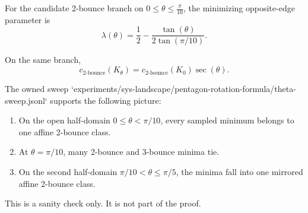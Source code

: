 \begin{unverified}
\begin{lemma}
\label{lem:pentagon-rotation-lambda}
For the candidate 2-bounce branch on $0 \le \theta \le \frac{\pi}{10}$, the
minimizing opposite-edge parameter is
\[
  \lambda(\theta)
  =
  \frac{1}{2}
  -
  \frac{\tan(\theta)}{2\tan(\pi/10)}.
\]
\end{lemma}
\end{unverified}

\begin{unverified}
\begin{lemma}
\label{lem:pentagon-rotation-capacity}
On the same branch,
\[
  c_{2\text{-bounce}}(K_\theta)
  =
  c_{2\text{-bounce}}(K_0)\sec(\theta).
\]
\end{lemma}
\end{unverified}

\begin{unverified}
\begin{lemma}
\label{lem:pentagon-rotation-empirical-branch}
The owned sweep
`experiments/sys-landscape/pentagon-rotation-formula/theta-sweep.jsonl`
supports the following picture:
\begin{enumerate}
\item On the open half-domain $0 \le \theta < \pi/10$, every sampled minimum
  belongs to one affine 2-bounce class.
\item At $\theta=\pi/10$, many 2-bounce and 3-bounce minima tie.
\item On the second half-domain $\pi/10 < \theta \le \pi/5$, the minima fall
  into one mirrored affine 2-bounce class.
\end{enumerate}
This is a sanity check only. It is not part of the proof.
\end{lemma}
\end{unverified}

